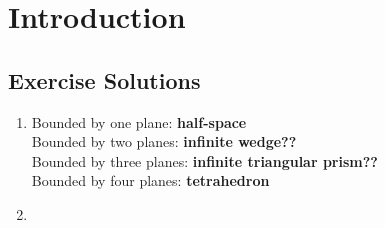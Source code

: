 \chapter{Introduction}
	
\section*{Exercise Solutions}

\begin{enumerate}
	\item Bounded by one plane: \textbf{half-space} \\
	Bounded by two planes: \textbf{infinite wedge??} \\
	Bounded by three planes: \textbf{infinite triangular prism??} \\
	Bounded by four planes: \textbf{tetrahedron}
	
	\item 
\end{enumerate}
